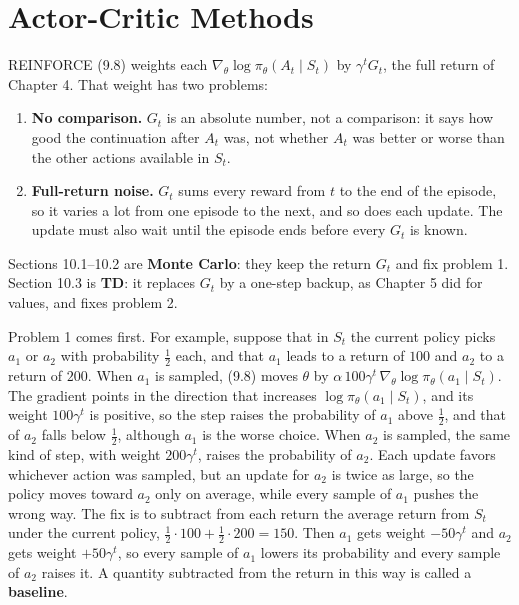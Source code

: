 \chapter{Actor-Critic Methods}

REINFORCE (9.8) weights each $\nabla_\theta\log\pi_\theta(A_t\mid S_t)$ by $\gamma^tG_t$, the full return of Chapter 4. That weight has two problems:

\begin{enumerate}
\item \textbf{No comparison.} $G_t$ is an absolute number, not a comparison: it says how good the continuation after $A_t$ was, not whether $A_t$ was better or worse than the other actions available in $S_t$.
\item \textbf{Full-return noise.} $G_t$ sums every reward from $t$ to the end of the episode, so it varies a lot from one episode to the next, and so does each update. The update must also wait until the episode ends before every $G_t$ is known.
\end{enumerate}
Sections 10.1--10.2 are \textbf{Monte Carlo}: they keep the return $G_t$ and fix problem 1. Section 10.3 is \textbf{TD}: it replaces $G_t$ by a one-step backup, as Chapter 5 did for values, and fixes problem 2.

Problem 1 comes first. For example, suppose that in $S_t$ the current policy picks $a_1$ or $a_2$ with probability $\tfrac12$ each, and that $a_1$ leads to a return of $100$ and $a_2$ to a return of $200$. When $a_1$ is sampled, (9.8) moves $\theta$ by $\alpha\,100\gamma^t\,\nabla_\theta\log\pi_\theta(a_1\mid S_t)$. The gradient points in the direction that increases $\log\pi_\theta(a_1\mid S_t)$, and its weight $100\gamma^t$ is positive, so the step raises the probability of $a_1$ above $\tfrac12$, and that of $a_2$ falls below $\tfrac12$, although $a_1$ is the worse choice. When $a_2$ is sampled, the same kind of step, with weight $200\gamma^t$, raises the probability of $a_2$. Each update favors whichever action was sampled, but an update for $a_2$ is twice as large, so the policy moves toward $a_2$ only on average, while every sample of $a_1$ pushes the wrong way. The fix is to subtract from each return the average return from $S_t$ under the current policy, $\tfrac12\cdot100+\tfrac12\cdot200=150$. Then $a_1$ gets weight $-50\gamma^t$ and $a_2$ gets weight $+50\gamma^t$, so every sample of $a_1$ lowers its probability and every sample of $a_2$ raises it. A quantity subtracted from the return in this way is called a \textbf{baseline}.

